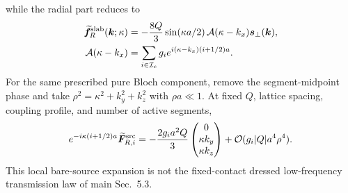 \documentclass[10pt,aps,onecolumn,notitlepage,nofootinbib]{revtex4-2}
\newcommand{\vk}{\bm k}
\newcommand{\vf}{\bm f}
\newcommand{\vF}{\bm F}
\newcommand{\order}{\mathcal O}
\begin{document}
while the radial part reduces to
\begin{align}
 \widetilde{\vf}^{\rm slab}_{R}(\vk;\kappa)
 &=-\frac{8Q}{3}\sin(\kappa a/2)\,
 \mathcal A(\kappa-k_x)\bm s_\perp(\vk),\\
 \mathcal A(\kappa-k_x)
 &=\sum_{i\in\mathcal I_c}g_i e^{i(\kappa-k_x)(i+1/2)a}.
\end{align}
For the same prescribed pure Bloch component, remove the segment-midpoint phase and take $\rho^2=\kappa^2+k_y^2+k_z^2$ with $\rho a\ll1$. At fixed $Q$, lattice spacing, coupling profile, and number of active segments,
\begin{equation}
 e^{-i\kappa(i+1/2)a}
 \widetilde{\vF}^{\rm src}_{R,i}
 =-\frac{2g_i a^2Q}{3}
  \begin{pmatrix}0\\ \kappa k_y\\ \kappa k_z\end{pmatrix}
 +\order(g_i|Q|a^4\rho^4).
 \label{eq:sm-long-wave-source}
\end{equation}
This local bare-source expansion is not the fixed-contact dressed low-frequency transmission law of main Sec.~5.3.
\end{document}
